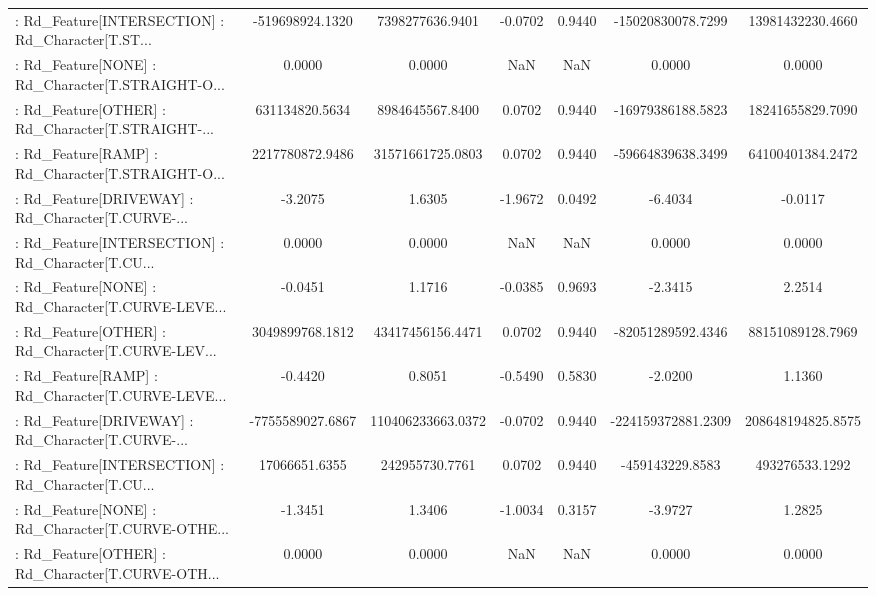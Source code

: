 \begin{longtable}{p{4cm}cccccc}
 : Rd\_Feature[INTERSECTION] : Rd\_Character[T.ST... &   -519698924.1320 &   7398277636.9401 & -0.0702 &       0.9440 &  -15020830078.7299 &  13981432230.4660 \\
 : Rd\_Feature[NONE] : Rd\_Character[T.STRAIGHT-O... &            0.0000 &            0.0000 &     NaN &          NaN &             0.0000 &            0.0000 \\
 : Rd\_Feature[OTHER] : Rd\_Character[T.STRAIGHT-... &    631134820.5634 &   8984645567.8400 &  0.0702 &       0.9440 &  -16979386188.5823 &  18241655829.7090 \\
 : Rd\_Feature[RAMP] : Rd\_Character[T.STRAIGHT-O... &   2217780872.9486 &  31571661725.0803 &  0.0702 &       0.9440 &  -59664839638.3499 &  64100401384.2472 \\
 : Rd\_Feature[DRIVEWAY] : Rd\_Character[T.CURVE-... &           -3.2075 &            1.6305 & -1.9672 &       0.0492 &            -6.4034 &           -0.0117 \\
 : Rd\_Feature[INTERSECTION] : Rd\_Character[T.CU... &            0.0000 &            0.0000 &     NaN &          NaN &             0.0000 &            0.0000 \\
 : Rd\_Feature[NONE] : Rd\_Character[T.CURVE-LEVE... &           -0.0451 &            1.1716 & -0.0385 &       0.9693 &            -2.3415 &            2.2514 \\
 : Rd\_Feature[OTHER] : Rd\_Character[T.CURVE-LEV... &   3049899768.1812 &  43417456156.4471 &  0.0702 &       0.9440 &  -82051289592.4346 &  88151089128.7969 \\
 : Rd\_Feature[RAMP] : Rd\_Character[T.CURVE-LEVE... &           -0.4420 &            0.8051 & -0.5490 &       0.5830 &            -2.0200 &            1.1360 \\
 : Rd\_Feature[DRIVEWAY] : Rd\_Character[T.CURVE-... &  -7755589027.6867 & 110406233663.0372 & -0.0702 &       0.9440 & -224159372881.2309 & 208648194825.8575 \\
 : Rd\_Feature[INTERSECTION] : Rd\_Character[T.CU... &     17066651.6355 &    242955730.7761 &  0.0702 &       0.9440 &    -459143229.8583 &    493276533.1292 \\
 : Rd\_Feature[NONE] : Rd\_Character[T.CURVE-OTHE... &           -1.3451 &            1.3406 & -1.0034 &       0.3157 &            -3.9727 &            1.2825 \\
 : Rd\_Feature[OTHER] : Rd\_Character[T.CURVE-OTH... &            0.0000 &            0.0000 &     NaN &          NaN &             0.0000 &            0.0000 \\

\end{longtable}
